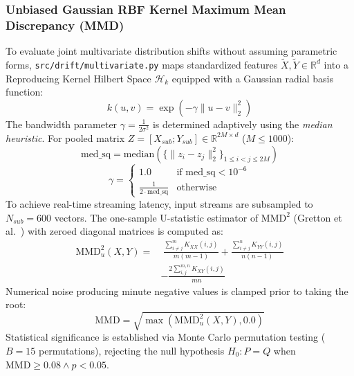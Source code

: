 \documentclass[conference]{IEEEtran}
\begin{document}
\subsubsection{Unbiased Gaussian RBF Kernel Maximum Mean Discrepancy (MMD)}
To evaluate joint multivariate distribution shifts without assuming parametric forms, \texttt{src/drift/multivariate.py} maps standardized features $\tilde{X}, \tilde{Y} \in \mathbb{R}^{d}$ into a Reproducing Kernel Hilbert Space $\mathcal{H}_k$ equipped with a Gaussian radial basis function:
\begin{equation}
k(u, v) = \exp\left( -\gamma \|u - v\|_2^2 \right)
\end{equation}
The bandwidth parameter $\gamma = \frac{1}{2\sigma^2}$ is determined adaptively using the \textit{median heuristic}. For pooled matrix $Z = [X_{sub}; Y_{sub}] \in \mathbb{R}^{2M \times d}$ ($M \le 1000$):
\begin{equation}
\text{med\_sq} = \text{median}\left( \{\|z_i - z_j\|_2^2\}_{1 \le i < j \le 2M} \right)
\end{equation}
\begin{equation}
\gamma = \begin{cases} 1.0 & \text{if } \text{med\_sq} < 10^{-6} \\ \frac{1}{2 \cdot \text{med\_sq}} & \text{otherwise} \end{cases}
\end{equation}
To achieve real-time streaming latency, input streams are subsampled to $N_{sub} = 600$ vectors. The one-sample U-statistic estimator of $\text{MMD}^2$ (Gretton et al.~\cite{gretton2012kernel}) with zeroed diagonal matrices is computed as:
\begin{equation}
\begin{aligned}
\text{MMD}_u^2(X, Y) = & \; \frac{\sum_{i \ne j}^m K_{XX}(i, j)}{m(m-1)} + \frac{\sum_{i \ne j}^n K_{YY}(i, j)}{n(n-1)} \\
& - \frac{2 \sum_{i, j}^{m, n} K_{XY}(i, j)}{mn}
\end{aligned}
\end{equation}
Numerical noise producing minute negative values is clamped prior to taking the root:
\begin{equation}
\text{MMD} = \sqrt{\max\left( \text{MMD}_u^2(X, Y), 0.0 \right)}
\end{equation}
Statistical significance is established via Monte Carlo permutation testing ($B = 15$ permutations), rejecting the null hypothesis $H_0: P = Q$ when $\text{MMD} \ge 0.08 \land p < 0.05$.
\end{document}
